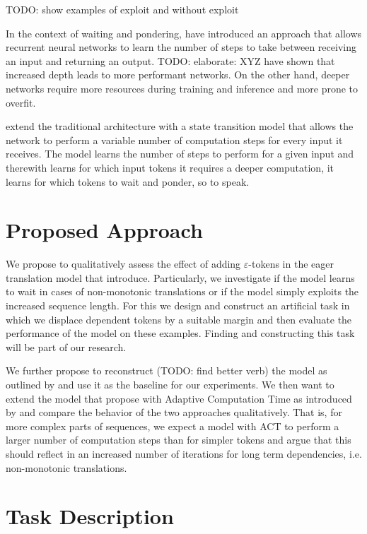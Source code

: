 \documentclass[english]{uzhpub}
\begin{document}
TODO: show examples of exploit and without exploit

In the context of waiting and pondering, \cite{act.graves2016adaptive} have introduced an approach that allows recurrent neural networks to learn the number of steps to take between receiving an input and returning an output. TODO: elaborate: XYZ have shown that increased depth leads to more performant networks. On the other hand, deeper networks require more resources during training and inference and more prone to overfit.

\cite{act.graves2016adaptive} extend the traditional architecture with a state transition model that allows the network to perform a variable number of computation steps for every input it receives. The model learns the number of steps to perform for a given input and therewith learns for which input tokens it requires a deeper computation, it learns for which tokens to wait and ponder, so to speak.

\section{Proposed Approach}
We propose to qualitatively assess the effect of adding $\varepsilon$-tokens in the eager translation model that \cite{youmaynotneedattention} introduce. Particularly, we investigate if the model learns to wait in cases of non-monotonic translations or if the model simply exploits the increased sequence length. For this we design and construct an artificial task in which we displace dependent tokens by a suitable margin and then evaluate the performance of the model on these examples.
Finding and constructing this task will be part of our research.

We further propose to reconstruct (TODO: find better verb) the model as outlined by \cite{youmaynotneedattention} and use it as the baseline for our experiments. We then want to extend the model that \cite{youmaynotneedattention} propose with Adaptive Computation Time as introduced by \cite{act.graves2016adaptive} and compare the behavior of the two approaches qualitatively. That is, for more complex parts of sequences, we expect a model with ACT to perform a larger number of computation steps than for simpler tokens and argue that this should reflect in an increased number of iterations for long term dependencies, i.e. non-monotonic translations.


\section{Task Description}
\end{document}
